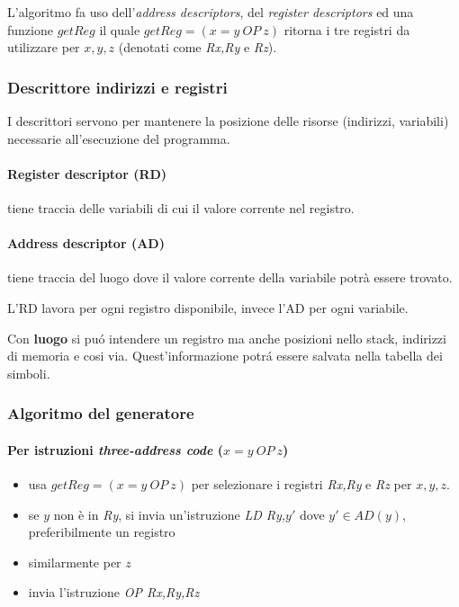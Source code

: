 L'algoritmo fa uso dell'\textit{address descriptors}, del
\textit{register descriptors} ed una funzione $getReg$ il quale
$getReg=(x=y \ OP \ z)$ ritorna i tre registri da utilizzare per $x,y,z$
(denotati come \textit{Rx,Ry} e \textit{Rz}).

\subsubsection{Descrittore indirizzi e registri}
I descrittori servono per mantenere la posizione delle risorse
(indirizzi, variabili) necessarie all'esecuzione del programma.

\paragraph{Register descriptor (RD)}
tiene traccia delle variabili di cui il valore corrente nel registro.
\paragraph{Address descriptor (AD)}
tiene traccia del luogo dove il valore corrente della variabile potr\`a
essere trovato.

L'RD lavora per ogni registro disponibile, invece l'AD per ogni variabile.

Con \textbf{luogo} si pu\'o intendere un registro ma anche posizioni nello
stack, indirizzi di memoria e cosi via. Quest'informazione potr\'a essere
salvata nella tabella dei simboli.

\subsubsection{Algoritmo del generatore}
\paragraph{Per istruzioni \textit{three-address code} ($x = y \ OP \ z$)}
\begin{itemize}
\item usa $getReg=(x=y \ OP \ z)$ per selezionare i registri \textit{Rx,Ry} e
\textit{Rz} per $x,y,z$.
\item se $y$ non \`e in \textit{Ry}, si invia un'istruzione \textit{LD Ry,$y'$}
dove $y' \in AD(y)$, preferibilmente un registro
\item similarmente per $z$
\item invia l'istruzione \textit{OP Rx,Ry,Rz}
\end{itemize}

